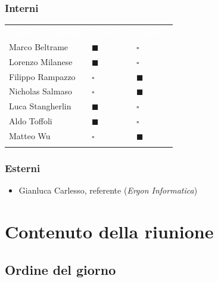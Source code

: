 \documentclass[12pt,a4paper]{article}
\newcommand{\tightlist}{\setlength{\itemsep}{1pt}\setlength{\parskip}{0pt}}
\begin{document}
\hypertarget{interni}{%
\subsubsection{Interni}}

\begin{center}
\begin{tabularx}{\linewidth}{>{\raggedright\arraybackslash}X>{\centering\arraybackslash}p{2.5cm}>{\centering\arraybackslash}p{2.5cm}}
\rowcolor{bfblue}\textcolor{white}{\textbf{Nome e Cognome}} & \textcolor{white}{\textbf{Presente}} & \textcolor{white}{\textbf{Assente}} \\
Marco Beltrame & $\blacksquare$ & $\square$ \\ \arrayrulecolor{bfline}\hline
Lorenzo Milanese & $\blacksquare$ & $\square$ \\ \arrayrulecolor{bfline}\hline
Filippo Rampazzo & $\square$ & $\blacksquare$ \\ \arrayrulecolor{bfline}\hline
Nicholas Salmaso & $\square$ & $\blacksquare$ \\ \arrayrulecolor{bfline}\hline
Luca Stangherlin & $\blacksquare$ & $\square$ \\ \arrayrulecolor{bfline}\hline
Aldo Toffoli & $\blacksquare$ & $\square$ \\ \arrayrulecolor{bfline}\hline
Matteo Wu & $\square$ & $\blacksquare$ \\ \arrayrulecolor{bfline}\hline
\end{tabularx}
\end{center}

\hypertarget{esterni}{%
\subsubsection{Esterni}}

\begin{itemize}
\tightlist
\item
  Gianluca Carlesso, referente (\emph{Ergon Informatica})
\end{itemize}

\newpage
\hypertarget{contenuto-della-riunione}{%
\section{Contenuto della riunione}}

\hypertarget{ordine-del-giorno}{%
\subsection{Ordine del giorno}}
\end{document}
